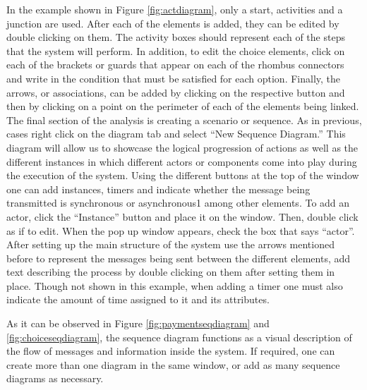 \documentclass[12pt]{article}
\begin{document}
In the example shown in Figure \ref{fig:actdiagram}, only a start, activities and a junction are used.  After each of the elements is added, they can be edited by double clicking on them. The activity boxes should represent each of the steps that the system will perform. In addition, to edit the choice elements, click on each of the brackets or guards that appear on each of the rhombus connectors and write in the condition that must be satisfied for each option. Finally, the arrows, or associations, can be added by clicking on the respective button and then by clicking on a point on the perimeter of each of the elements being linked.
	The final section of the analysis is creating a scenario or sequence. As in previous, cases right click on the diagram tab and select “New Sequence Diagram.” This diagram will allow us to showcase the logical progression of actions as well as the different instances in which different actors or components come into play during the execution of the system. Using the different buttons at the top of the window one can add instances, timers and indicate whether the message being transmitted is synchronous or asynchronous1 among other elements. 
To add an actor, click the “Instance” button and place it on the window. Then, double click as if to edit. When the pop up window appears, check the box that says “actor”. After setting up the main structure of the system use the arrows mentioned before to represent the messages being sent between the different elements, add text describing the process by double clicking on them after setting them in place. Though not shown in this example, when adding a timer one must also indicate the amount of time assigned to it and its attributes.

As it can be observed in Figure \ref{fig:paymentseqdiagram} and \ref{fig:choiceseqdiagram}, the sequence diagram functions as a visual description of the flow of messages and information inside the system. If required, one can create more than one diagram in the same window, or add as many sequence diagrams as necessary.
\end{document}
